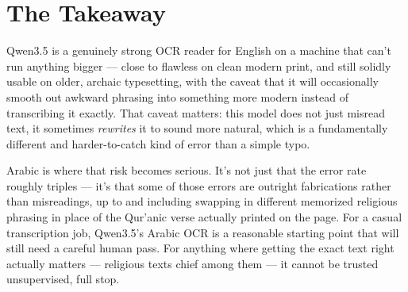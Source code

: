 \documentclass[11pt]{article}
\begin{document}
\section{The Takeaway}

Qwen3.5 is a genuinely strong OCR reader for English on a machine that can't run anything
bigger --- close to flawless on clean modern print, and still solidly usable on older,
archaic typesetting, with the caveat that it will occasionally smooth out awkward phrasing
into something more modern instead of transcribing it exactly. That caveat matters: this
model does not just misread text, it sometimes \emph{rewrites} it to sound more natural,
which is a fundamentally different and harder-to-catch kind of error than a simple typo.

Arabic is where that risk becomes serious. It's not just that the error rate roughly triples
--- it's that some of those errors are outright fabrications rather than misreadings, up to
and including swapping in different memorized religious phrasing in place of the Qur'anic
verse actually printed on the page. For a casual transcription job, Qwen3.5's Arabic OCR is
a reasonable starting point that will still need a careful human pass. For anything where
getting the exact text right actually matters --- religious texts chief among them --- it
cannot be trusted unsupervised, full stop.
\end{document}
